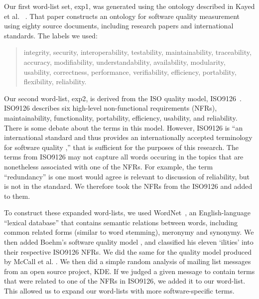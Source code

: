 \documentclass[]{sig-alternate}
\begin{document}
Our first word-list set, \textsf{exp1}, was generated using the ontology described in Kayed et al.~\cite{5072519} .
That paper constructs an ontology for software quality measurement using eighty source documents, including research papers and international standards. 
The labels we used:
\begin{quotation}
\small \noindent \textsf{
integrity, security,
interoperability, testability, maintainability, traceability,
accuracy, modifiability, understandability, availability, modularity,
usability, correctness, performance, verifiability, efficiency,
portability, flexibility, reliability.
}
\end{quotation}

Our second word-list, \textsf{exp2}, is derived from the ISO quality model, ISO9126~\cite{iso9126}. 
ISO9126 describes six high-level non-functional requirements (NFRs), maintainability, functionality, portability, efficiency, usability, and reliability. 
There is some debate about the terms in this model. 
However, ISO9126 is ``an international standard and thus provides an internationally accepted terminology for software quality \cite[p. 58]{Boegh2008},'' that is sufficient for the purposes of this research.  
The terms from ISO9126 may not capture all words occuring in the topics that are nonetheless associated with one of the NFRs. 
For example, the term ``redundancy'' is one most would agree is relevant to discussion of reliability, but is not in the standard. 
We therefore took the NFRs from the ISO9126 and added to them.

To construct these expanded word-lists, we used WordNet~\cite{Fellbaum1998}, an English-language ``lexical database'' that contains semantic relations between words, including common related forms (similar to word stemming), meronymy and synonymy. 
We then added Boehm's software quality model \cite{Boehm+:1976:ICSE}, and classified his eleven `ilities' into their respective ISO9126 NFRs. 
We did the same for the quality model produced by McCall et al. \cite{mccall1977}. 
We then did a simple random analysis of mailing list messages from an open source project, KDE. If we judged a given message to contain terms that were related to one of the NFRs in ISO9126, we added it to our word-list. This allowed us to expand our word-lists with more software-specific terms.
\end{document}
